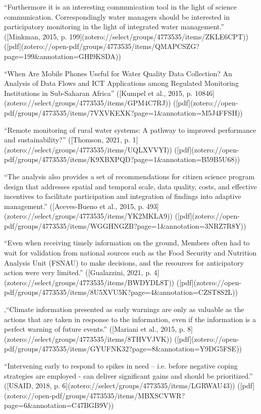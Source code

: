 “Furthermore it is an interesting communication tool in the light of science communication. Correspondingly water managers should be interested in participatory monitoring in the light of integrated water management.” ([Minkman, 2015, p. 199](zotero://select/groups/4773535/items/ZKLE6CPT)) ([pdf](zotero://open-pdf/groups/4773535/items/QMAPCSZG?page=199&annotation=GHI9KSDA))

“When Are Mobile Phones Useful for Water Quality Data Collection? An Analysis of Data Flows and ICT Applications among Regulated Monitoring Institutions in Sub-Saharan Africa” ([Kumpel et al., 2015, p. 10846](zotero://select/groups/4773535/items/GPM4C7RJ)) ([pdf](zotero://open-pdf/groups/4773535/items/7VXVKEXK?page=1&annotation=M5J4FFSH))

“Remote monitoring of rural water systems: A pathway to improved performance and sustainability?” ([Thomson, 2021, p. 1](zotero://select/groups/4773535/items/UQLXVVYI)) ([pdf](zotero://open-pdf/groups/4773535/items/K9XBXPQD?page=1&annotation=B59B5U68))

“The analysis also provides a set of recommendations for citizen science program design that addresses spatial and temporal scale, data quality, costs, and effective incentives to facilitate participation and integration of findings into adaptive management.” ([Aceves-Bueno et al., 2015, p. 493](zotero://select/groups/4773535/items/YK2MKLA9)) ([pdf](zotero://open-pdf/groups/4773535/items/WGGHNGZB?page=1&annotation=3NRZ7R8Y))

“Even when receiving timely information on the ground, Members often had to wait for validation from national sources such as the Food Security and Nutrition Analysis Unit (FSNAU) to make decisions, and the resources for anticipatory action were very limited.” ([Gualazzini, 2021, p. 4](zotero://select/groups/4773535/items/BWDYDL8T)) ([pdf](zotero://open-pdf/groups/4773535/items/8U5XVU5K?page=4&annotation=CZST8S2L))

,“Climate information presented as early warnings are only as valuable as the actions that are taken in response to the information, even if the information is a perfect warning of future events.” ([Mariani et al., 2015, p. 8](zotero://select/groups/4773535/items/8THVVJVK)) ([pdf](zotero://open-pdf/groups/4773535/items/GYUFNK32?page=8&annotation=Y9DG5FSE))

“Intervening early to respond to spikes in need – i.e. before negative coping strategies are employed - can deliver significant gains and should be prioritized.” ([USAID, 2018, p. 6](zotero://select/groups/4773535/items/LGRWAU43)) ([pdf](zotero://open-pdf/groups/4773535/items/MBXSCVWR?page=6&annotation=C47BGB9V))










